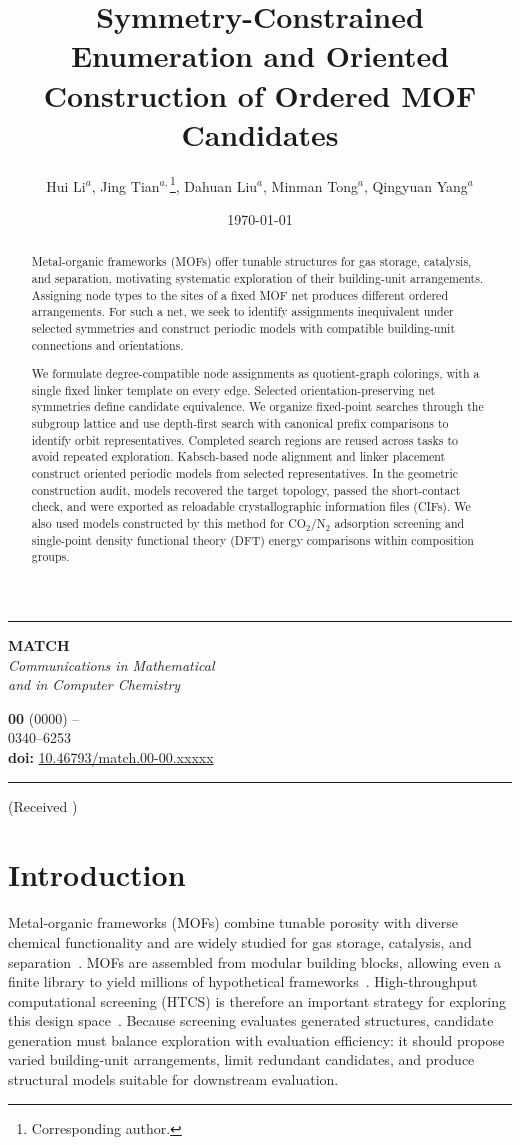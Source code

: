 \documentclass[a5paper, 10pt]{article}
\title{Symmetry-Constrained Enumeration and Oriented Construction of Ordered MOF Candidates}
\author{Hui Li$^{a}$, Jing Tian$^{a,}$\footnote{Corresponding author.}, Dahuan Liu$^{a}$, Minman Tong$^{a}$, Qingyuan Yang$^{a}$}
\date{\today}
\makeatletter
\renewcommand{\maketitle}{
  \begin{center}
    \rule[.2em]{\textwidth}{0.353mm}
    \begin{minipage}[m]{0.35\textwidth}
      {\scriptsize
        \begin{center}
          \textsf{\textbf{\huge MATCH}\\
            \textit{Communications in Mathematical\\
              and in Computer Chemistry}}
        \end{center}}
    \end{minipage}\hfill
    \begin{minipage}[m]{0.65\textwidth}
      \begin{flushright}
        \baselineskip=10pt
        {\scriptsize\sffamily{\itshape MATCH Commun. Math. Comput. Chem.}
          \textbf{\vol{}}
          (\pubyear)
          \thepage--\pageref{LastPage}}\\
        {\scriptsize\sffamily {\bfseries ISSN:} 0340--6253}\\
        {\scriptsize\sffamily \textbf{doi:} \doi{10.46793/match.\vol-\num.\id}}
      \end{flushright}
    \end{minipage}
    \rule[1em]{\textwidth}{.353mm}
    \baselineskip=0.30in
    {\Large\bfseries \@title} \par
    \vspace{5mm}
    \baselineskip=0.2in
    {\large\bfseries \@author}\par
    \vspace{1mm}
    {\it \@address} \par
    {\small\tt \@email} \par
    \vspace{3mm}
    {\small (Received \@date)} \par
  \end{center}
  \vspace{3mm}
}
\newcommand{\doi}[1]{\href{https://doi.org/#1}{#1}}
\newcommand{\vol}{00}
\newcommand{\num}{00}
\newcommand{\pubyear}{0000}
\newcommand{\id}{xxxxx}
\makeatother
\begin{document}
\maketitle
\begin{abstract}
\setlength{\emergencystretch}{2em}

Metal-organic frameworks (MOFs) offer tunable structures for gas storage, catalysis, and separation, motivating systematic exploration of their building-unit arrangements. Assigning node types to the sites of a fixed MOF net produces different ordered arrangements. For such a net, we seek to identify assignments inequivalent under selected symmetries and construct periodic models with compatible building-unit connections and orientations.

We formulate degree-compatible node assignments as quotient-graph colorings, with a single fixed linker template on every edge. Selected orientation-preserving net symmetries define candidate equivalence. We organize fixed-point searches through the subgroup lattice and use depth-first search with canonical prefix comparisons to identify orbit representatives. Completed search regions are reused across tasks to avoid repeated exploration. Kabsch-based node alignment and linker placement construct oriented periodic models from selected representatives. In the geometric construction audit, models recovered the target topology, passed the short-contact check, and were exported as reloadable crystallographic information files (CIFs). We also used models constructed by this method for CO$_2$/N$_2$ adsorption screening and single-point density functional theory (DFT) energy comparisons within composition groups.
\end{abstract}
\onehalfspacing




\section{Introduction}
\label{sec:intro}
Metal-organic frameworks (MOFs) combine tunable porosity with diverse chemical functionality and are widely studied for gas storage, catalysis, and separation~\cite{furukawa2013chemistry}.
MOFs are assembled from modular building blocks, allowing even a finite library to yield millions of hypothetical frameworks~\cite{wilmer2012large}. High-throughput computational screening (HTCS) is therefore an important strategy for exploring this design space~\cite{colon2014high}.
Because screening evaluates generated structures, candidate generation must balance exploration with evaluation efficiency: it should propose varied building-unit arrangements, limit redundant candidates, and produce structural models suitable for downstream evaluation.%
\end{document}
